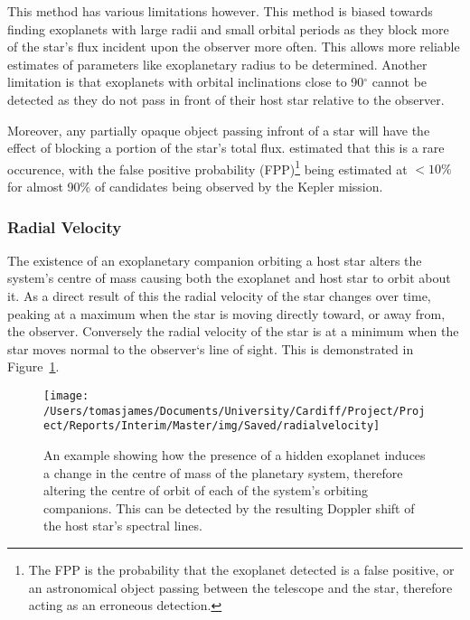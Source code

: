 \documentclass{report}
\begin{document}
This method has various limitations however. This method is biased towards finding exoplanets with large radii and small orbital periods as they block more of the star’s flux incident upon the observer more often. This allows more reliable estimates of parameters like exoplanetary radius to be determined. Another limitation is that exoplanets with orbital inclinations close to 90$^\circ$ cannot be detected as they do not pass in front of their host star relative to the observer.

Moreover, any partially opaque object passing infront of a star will have the effect of blocking a portion of the star's total flux. \textcite{false} estimated that this is a rare occurence, with the false positive probability (FPP)\footnote{The FPP is the probability that the exoplanet detected is a false positive, or an astronomical object passing between the telescope and the star, therefore acting as an erroneous detection.} being estimated at $<10\%$ for almost 90\% of candidates being observed by the Kepler mission.

\subsubsection{Radial Velocity }
The existence of an exoplanetary companion orbiting a host star alters the system's centre of mass causing both the exoplanet and host star to orbit about it. As a direct result of this the radial velocity of the star changes over time, peaking at a maximum when the star is moving directly toward, or away from, the observer. Conversely the radial velocity of the star is at a minimum when the star moves normal to the observer`s line of sight. This is demonstrated in Figure~\ref{rvdetect}.

\begin{figure}[H]
\centering
    \texttt{[image: /Users/tomasjames/Documents/University/Cardiff/Project/Project/Reports/Interim/Master/img/Saved/radialvelocity]}
\caption[An example showing how the presence of a hidden exoplanet induces a change in the centre of mass of the planetary system, therefore altering the centre of orbit of each of the system's orbiting companions. This can be detected by the resulting Doppler shift of the host star's spectral lines.] {An example showing how the presence of a hidden exoplanet induces a change in the centre of mass of the planetary system, therefore altering the centre of orbit of each of the system's orbiting companions. This can be detected by the resulting Doppler shift of the host star's spectral lines. \parencite{rvdetect}}\label{rvdetect}
\end{figure}
\end{document}
